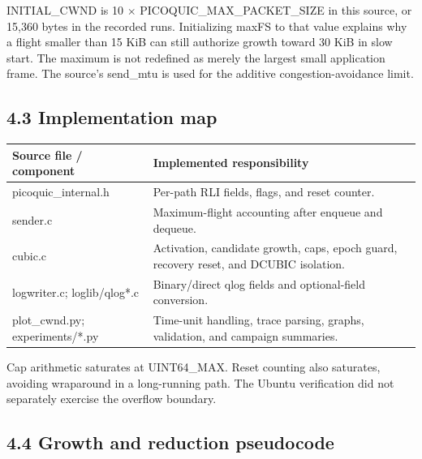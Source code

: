 INITIAL\_CWND is 10 \(\times\) PICOQUIC\_MAX\_PACKET\_SIZE in this source, or 15,360 bytes in the recorded runs. Initializing maxFS to that value explains why a flight smaller than 15 KiB can still authorize growth toward 30 KiB in slow start. The maximum is not redefined as merely the largest small application frame. The source's send\_mtu is used for the additive congestion-avoidance limit.


\subsection*{4.3 Implementation map}

\begingroup\small\setlength{\tabcolsep}{4pt}\renewcommand{\arraystretch}{1.15}
\noindent\begin{tabular}{|>{\raggedright\arraybackslash}p{}|>{\raggedright\arraybackslash}p{}|}
\hline
\textbf{Source file / component} & \textbf{Implemented responsibility} \\ \hline
picoquic\_internal.h & Per-path RLI fields, flags, and reset counter. \\ \hline
sender.c & Maximum-flight accounting after enqueue and dequeue. \\ \hline
cubic.c & Activation, candidate growth, caps, epoch guard, recovery reset, and DCUBIC isolation. \\ \hline
logwriter.c; loglib/qlog*.c & Binary/direct qlog fields and optional-field conversion. \\ \hline
plot\_cwnd.py; experiments/*.py & Time-unit handling, trace parsing, graphs, validation, and campaign summaries. \\ \hline
\end{tabular}\endgroup
\par\vspace{0.6em}

Cap arithmetic saturates at UINT64\_MAX. Reset counting also saturates, avoiding wraparound in a long-running path. The Ubuntu verification did not separately exercise the overflow boundary.


\subsection*{4.4 Growth and reduction pseudocode}


